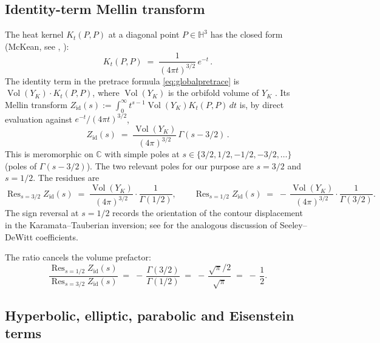 \documentclass[11pt,a4paper,reqno]{amsart}
\theoremstyle{definition}
\DeclareMathOperator{\Vol}{Vol}
\DeclareMathOperator{\Res}{Res}
\newcommand{\HH}{\mathbb{H}}
\newcommand{\CC}{\mathbb{C}}
\newcommand{\YK}{Y_K}
\begin{document}
\subsection{Identity-term Mellin transform}\label{ss:Bid}

The heat kernel $K_t(P,P)$ at a diagonal point $P\in\HH^3$ has the closed form
(McKean, see \cite[\S3.5]{ElstrodtGrunewaldMennicke1998},
\cite[\S2]{Vassilevich2003}):
\begin{equation}\label{eq:McKean}
  K_t(P,P) \;=\; \frac{1}{(4\pi t)^{3/2}}\, e^{-t}\,.
\end{equation}
The identity term in the pretrace formula \eqref{eq:globalpretrace} is
$\Vol(\YK)\cdot K_t(P,P)$, where $\Vol(\YK)$ is the orbifold volume of $\YK$
\cite[\S8.1]{ElstrodtGrunewaldMennicke1998}.  Its Mellin transform
$Z_{\mathrm{id}}(s) := \int_0^\infty t^{s-1}\Vol(\YK)K_t(P,P)\,dt$ is, by
direct evaluation against $e^{-t}/(4\pi t)^{3/2}$,
\begin{equation}\label{eq:Zid}
  Z_{\mathrm{id}}(s) \;=\; \frac{\Vol(\YK)}{(4\pi)^{3/2}}\,\Gamma(s-3/2)\,.
\end{equation}
This is meromorphic on $\CC$ with simple poles at $s\in\{3/2,1/2,-1/2,-3/2,
\ldots\}$ (poles of $\Gamma(s-3/2)$).  The two relevant poles for our purpose
are $s=3/2$ and $s=1/2$.  The residues are
\begin{equation}\label{eq:residues}
  \Res_{s=3/2}Z_{\mathrm{id}}(s)
     \;=\; \frac{\Vol(\YK)}{(4\pi)^{3/2}}\cdot\frac{1}{\Gamma(1/2)},
  \qquad
  \Res_{s=1/2}Z_{\mathrm{id}}(s)
     \;=\; -\,\frac{\Vol(\YK)}{(4\pi)^{3/2}}\cdot\frac{1}{\Gamma(3/2)}.
\end{equation}
The sign reversal at $s=1/2$ records the orientation of the contour
displacement in the Karamata--Tauberian inversion; see
\cite[\S2.2]{Vassilevich2003} for the analogous discussion of Seeley--DeWitt
coefficients.

The ratio cancels the volume prefactor:
\begin{equation}\label{eq:ratio}
  \frac{\Res_{s=1/2}Z_{\mathrm{id}}(s)}{\Res_{s=3/2}Z_{\mathrm{id}}(s)}
  \;=\; -\,\frac{\Gamma(3/2)}{\Gamma(1/2)} \;=\; -\,\frac{\sqrt{\pi}/2}{\sqrt{\pi}} \;=\; -\,\frac{1}{2}.
\end{equation}

\subsection{Hyperbolic, elliptic, parabolic and Eisenstein terms}\label{ss:Bother}
\end{document}
